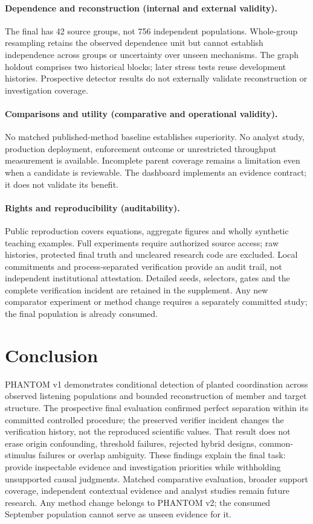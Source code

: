 \documentclass[sigconf,nonacm]{acmart}
\begin{document}
\paragraph{Dependence and reconstruction (internal and external validity).} The final has 42 source groups, not 756 independent populations. Whole-group resampling retains the observed dependence unit but cannot establish independence across groups or uncertainty over unseen mechanisms. The graph holdout comprises two historical blocks; later stress tests reuse development histories. Prospective detector results do not externally validate reconstruction or investigation coverage.

\paragraph{Comparisons and utility (comparative and operational validity).} No matched published-method baseline establishes superiority. No analyst study, production deployment, enforcement outcome or unrestricted throughput measurement is available. Incomplete parent coverage remains a limitation even when a candidate is reviewable. The dashboard implements an evidence contract; it does not validate its benefit.

\paragraph{Rights and reproducibility (auditability).} Public reproduction covers equations, aggregate figures and wholly synthetic teaching examples. Full experiments require authorized source access; raw histories, protected final truth and uncleared research code are excluded. Local commitments and process-separated verification provide an audit trail, not independent institutional attestation. Detailed seeds, selectors, gates and the complete verification incident are retained in the supplement. Any new comparator experiment or method change requires a separately committed study; the final population is already consumed.

\section{Conclusion}
PHANTOM v1 demonstrates conditional detection of planted coordination across observed listening populations and bounded reconstruction of member and target structure. The prospective final evaluation confirmed perfect separation within its committed controlled procedure; the preserved verifier incident changes the verification history, not the reproduced scientific values. That result does not erase origin confounding, threshold failures, rejected hybrid designs, common-stimulus failures or overlap ambiguity. These findings explain the final task: provide inspectable evidence and investigation priorities while withholding unsupported causal judgments. Matched comparative evaluation, broader support coverage, independent contextual evidence and analyst studies remain future research. Any method change belongs to PHANTOM v2; the consumed September population cannot serve as unseen evidence for it.
\end{document}
